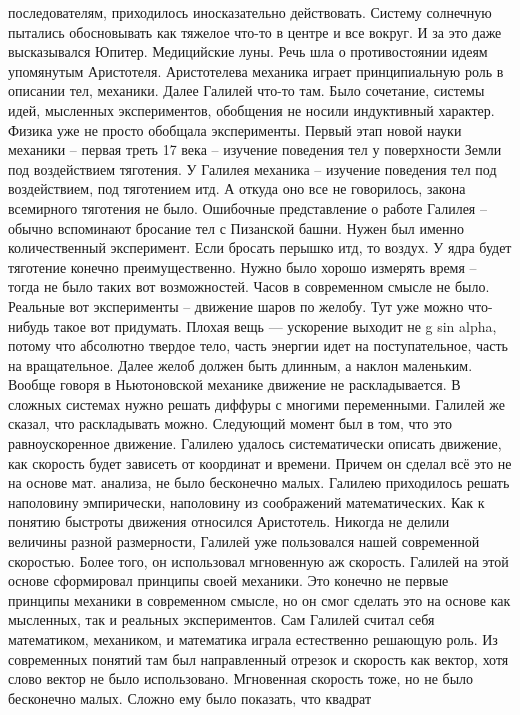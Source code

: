 \documentclass[a4paper, 12pt]{article}
\begin{document}
последователям, приходилось иносказательно действовать. Систему 
солнечную пытались обосновывать как тяжелое что-то в центре и все 
вокруг. И за это даже высказывался Юпитер. Медицийские луны. Речь шла 
о противостоянии идеям упомянутым Аристотеля. Аристотелева механика 
играет принципиальную роль в описании тел, механики. Далее Галилей 
что-то там. Было сочетание, системы идей, мысленных экспериментов, 
обобщения не носили индуктивный характер. Физика уже не просто обобщала 
эксперименты. Первый этап новой науки механики -- первая треть 17 века 
-- изучение поведения тел у поверхности Земли под воздействием 
тяготения. У Галилея механика -- изучение поведения тел под 
воздействием, под тяготением итд. А откуда оно все не говорилось, закона 
всемирного тяготения не было. Ошибочные представление о работе Галилея 
-- обычно вспоминают бросание тел с Пизанской башни. Нужен был именно 
количественный эксперимент. Если бросать перышко итд, то воздух. У ядра 
будет тяготение конечно преимущественно. Нужно было хорошо измерять 
время -- тогда не было таких вот возможностей. Часов в современном 
смысле не было. Реальные вот эксперименты -- движение шаров по желобу. 
Тут уже можно что-нибудь такое вот придумать. Плохая вещь --- ускорение 
выходит не g sin alpha, потому что абсолютно твердое тело, часть энергии 
идет на поступательное, часть на вращательное. Далее желоб должен быть 
длинным, а наклон маленьким. Вообще говоря в Ньютоновской механике 
движение не раскладывается. В сложных системах нужно решать диффуры 
с многими переменными. Галилей же сказал, что раскладывать можно. 
Следующий момент был в том, что это равноускоренное движение. Галилею 
удалось систематически описать движение, как скорость будет зависеть от 
координат и времени. Причем он сделал всё это не на основе мат. анализа, 
не было бесконечно малых. Галилею приходилось решать наполовину 
эмпирически, наполовину из соображений математических. Как к понятию 
быстроты движения относился Аристотель. Никогда не делили величины 
разной размерности, Галилей уже пользовался нашей современной скоростью. 
Более того, он использовал мгновенную аж скорость. Галилей на этой 
основе сформировал принципы своей механики. Это конечно не первые 
принципы механики в современном смысле, но он смог сделать это на основе 
как мысленных, так и реальных экспериментов. Сам Галилей считал себя 
математиком, механиком, и математика играла естественно решающую роль. 
Из современных понятий там был направленный отрезок и скорость как 
вектор, хотя слово вектор не было использовано. Мгновенная скорость 
тоже, но не было бесконечно малых. Сложно ему было показать, что квадрат 
\end{document}
